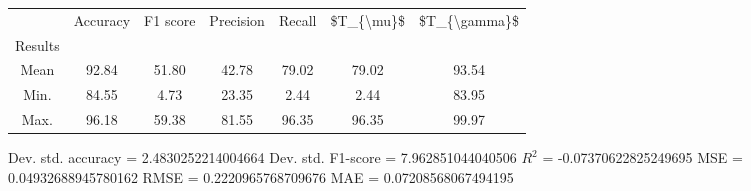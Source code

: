\begin{tabular}{|c|c|c|c|c|c|c|}
\toprule
{} &  Accuracy &  F1 score &  Precision &  Recall &  \$T\_\{\textbackslash mu\}\$ &  \$T\_\{\textbackslash gamma\}\$ \\
Results &           &           &            &         &            &               \\
\hline
Mean    &     92.84 &     51.80 &      42.78 &   79.02 &      79.02 &         93.54 \\
Min.    &     84.55 &      4.73 &      23.35 &    2.44 &       2.44 &         83.95 \\
Max.    &     96.18 &     59.38 &      81.55 &   96.35 &      96.35 &         99.97 \\
\bottomrule
\end{tabular}

 Dev. std. accuracy = 2.4830252214004664
 Dev. std. F1-score = 7.962851044040506
 $R^2$ = -0.07370622825249695
 MSE = 0.04932688945780162
 RMSE = 0.2220965768709676
 MAE = 0.07208568067494195